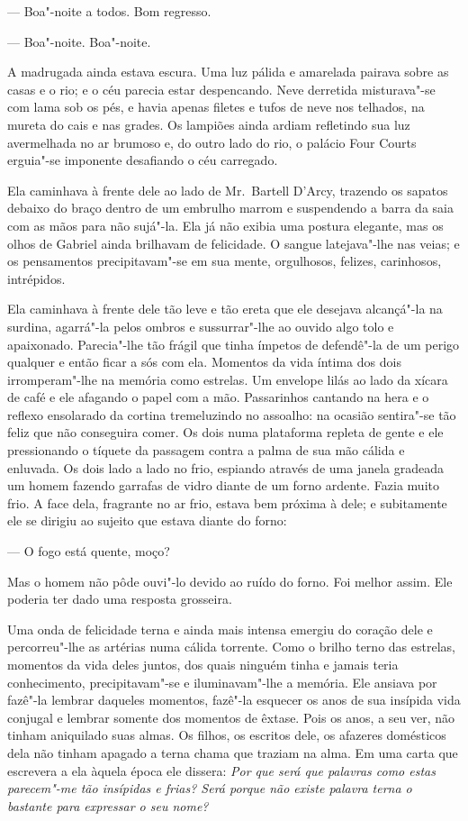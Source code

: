 --- Boa"-noite a todos.  Bom regresso.

--- Boa"-noite.  Boa"-noite.

A madrugada ainda estava escura.  Uma luz pálida e amarelada pairava sobre as
casas e o rio; e o céu parecia estar despencando.  Neve derretida misturava"-se
com lama sob os pés, e havia apenas filetes e tufos de neve nos telhados, na
mureta do cais e nas grades.  Os lampiões ainda ardiam refletindo sua luz
avermelhada no ar brumoso e, do outro lado do rio, o palácio Four Courts
erguia"-se imponente desafiando o céu carregado.

Ela caminhava à frente dele ao lado de Mr.~Bartell D’Arcy, trazendo os sapatos
debaixo do braço dentro de um embrulho marrom e suspendendo a barra da saia com
as mãos para não sujá"-la.  Ela já não exibia uma postura elegante, mas os olhos
de Gabriel ainda brilhavam de felicidade.  O sangue latejava"-lhe nas veias; e
os pensamentos precipitavam"-se em sua mente, orgulhosos, felizes, carinhosos,
intrépidos.

Ela caminhava à frente dele tão leve e tão ereta que ele desejava alcançá"-la na
surdina, agarrá"-la pelos ombros e sussurrar"-lhe ao ouvido algo tolo e
apaixonado.  Parecia"-lhe tão frágil que tinha ímpetos de defendê"-la de um
perigo qualquer e então ficar a sós com ela.  Momentos da vida íntima dos dois
irromperam"-lhe na memória como estrelas.  Um envelope lilás ao lado da xícara
de café e ele afagando o papel com a mão.  Passarinhos cantando na hera e o
reflexo ensolarado da cortina tremeluzindo no assoalho: na ocasião sentira"-se
tão feliz que não conseguira comer.  Os dois numa plataforma repleta de gente e
ele pressionando o tíquete da passagem contra a palma de sua mão cálida e
enluvada.  Os dois lado a lado no frio, espiando através de uma janela gradeada
um homem fazendo garrafas de vidro diante de um forno ardente.  Fazia muito
frio.  A face dela, fragrante no ar frio, estava bem próxima à dele; e
subitamente ele se dirigiu ao sujeito que estava diante do forno:

--- O fogo está quente, moço?

Mas o homem não pôde ouvi"-lo devido ao ruído do forno.  Foi melhor assim.  Ele
poderia ter dado uma resposta grosseira.

Uma onda de felicidade terna e ainda mais intensa emergiu do coração dele e
percorreu"-lhe as artérias numa cálida torrente.  Como o brilho terno das
estrelas, momentos da vida deles juntos, dos quais ninguém tinha e jamais teria
conhecimento, precipitavam"-se e iluminavam"-lhe a memória.  Ele ansiava por
fazê"-la lembrar daqueles momentos, fazê"-la esquecer os anos de sua insípida
vida conjugal e lembrar somente dos momentos de êxtase.  Pois os anos, a seu
ver, não tinham aniquilado suas almas.  Os filhos, os escritos dele, os
afazeres domésticos dela não tinham apagado a terna chama que traziam na alma.
Em uma carta que escrevera a ela àquela época ele dissera: \textit{Por
que será que palavras como estas parecem"-me tão insípidas e
frias? Será porque não existe palavra terna o bastante para expressar
o seu nome?}

